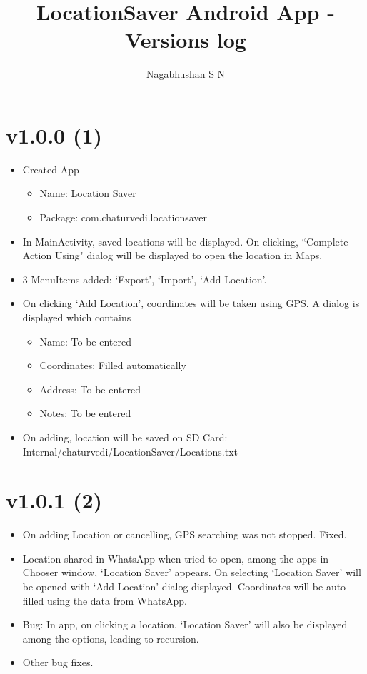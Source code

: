 \documentclass{article}
\title{LocationSaver Android App - Versions log}
\author{Nagabhushan S N}
\begin{document}
\maketitle
\tableofcontents
\newpage

\section{v1.0.0 (1)}\label{sec:1}
\begin{itemize}
\item Created App
  \begin{itemize}
  \item Name: Location Saver
  \item Package: com.chaturvedi.locationsaver
  \end{itemize}
\item In MainActivity, saved locations will be displayed. On clicking, ``Complete Action Using" dialog will be displayed to open the location in Maps.
\item 3 MenuItems added: `Export', `Import', `Add Location'.
\item On clicking `Add Location', coordinates will be taken using GPS. A dialog is displayed which contains 
  \begin{itemize}
  \item Name: To be entered
  \item Coordinates: Filled automatically
  \item Address: To be entered
  \item Notes: To be entered
  \end{itemize}
\item On adding, location will be saved on SD Card: Internal/chaturvedi/LocationSaver/Locations.txt
\end{itemize}

\section{v1.0.1 (2)}\label{sec:2}
\begin{itemize}
\item On adding Location or cancelling, GPS searching was not stopped. Fixed.
\item Location shared in WhatsApp when tried to open, among the apps in Chooser window, `Location Saver' appears. On selecting `Location Saver' will be opened with `Add Location' dialog displayed. Coordinates will be auto-filled using the data from WhatsApp.
\item Bug: In app, on clicking a location, `Location Saver' will also be displayed among the options, leading to recursion.
\item Other bug fixes.
\end{itemize}
\end{document}
